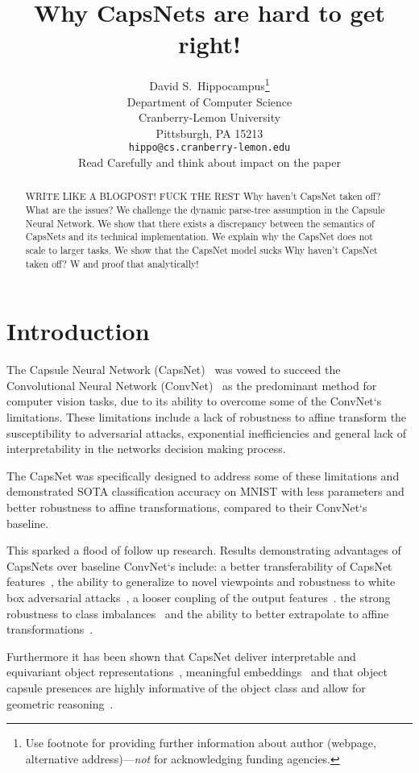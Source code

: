 \documentclass{article}
\title{                                                                                                                                          
	Why CapsNets are hard to get right!
}
\author{%
  David S.~Hippocampus\thanks{Use footnote for providing further information
    about author (webpage, alternative address)---\emph{not} for acknowledging
    funding agencies.} \\
  Department of Computer Science\\
  Cranberry-Lemon University\\
  Pittsburgh, PA 15213 \\
  \texttt{hippo@cs.cranberry-lemon.edu} \\Read Carefully and think about impact on the paper
}
\begin{document}
\maketitle

\begin{abstract}
  WRITE LIKE A BLOGPOST! FUCK THE REST 
  Why haven't CapsNet taken off? What are the issues?
  We challenge the dynamic parse-tree assumption in the Capsule Neural Network.
  We show that there exists a discrepancy between the semantics of CapsNets and its technical implementation.
  We explain why the CapsNet does not scale to larger tasks.
  We show that the CapsNet model sucks
  Why haven't CapsNet taken off? W and proof that analytically!
\end{abstract}

\section{Introduction}

The Capsule Neural Network (CapsNet)~\cite{nips/SabourFH17} was vowed to succeed the Convolutional Neural Network (ConvNet)~\cite{neco/LeCunBDHHHJ89} as the predominant method for computer vision tasks, due to its ability to overcome some of the ConvNet`s limitations. %
These limitations include
a lack of robustness to affine transform%
the susceptibility to adversarial attacks,
exponential inefficiencies
and general lack of interpretability in the networks decision making process. %

The CapsNet was specifically designed to address some of these limitations and demonstrated SOTA classification accuracy on MNIST with less parameters and better robustness to affine transformations, compared to their ConvNet`s baseline.

This sparked a flood of follow up research.
Results demonstrating advantages of CapsNets over baseline ConvNet`s include:
a better transferability of CapsNet features~\cite{corr/Ancheng2018},
the ability to generalize to novel viewpoints and robustness to white box adversarial attacks~\cite{iclr/HintonSF18},
a looser coupling of the output features~\cite{corr/Lin2018}.
the strong robustness to class imbalances~\cite{miccai/Jimenez-Sanchez18} and
the ability to better extrapolate to affine transformations~\cite{cvpr/GuT20}.

Furthermore it has been shown that CapsNet deliver interpretable and equivariant object representations~\cite{nips/LenssenFL18}, meaningful embeddings~\cite{corr/Lin2018} and that object capsule presences are highly informative of the object class and allow for geometric reasoning~\cite{nips/KosiorekSTH19}.
\end{document}
